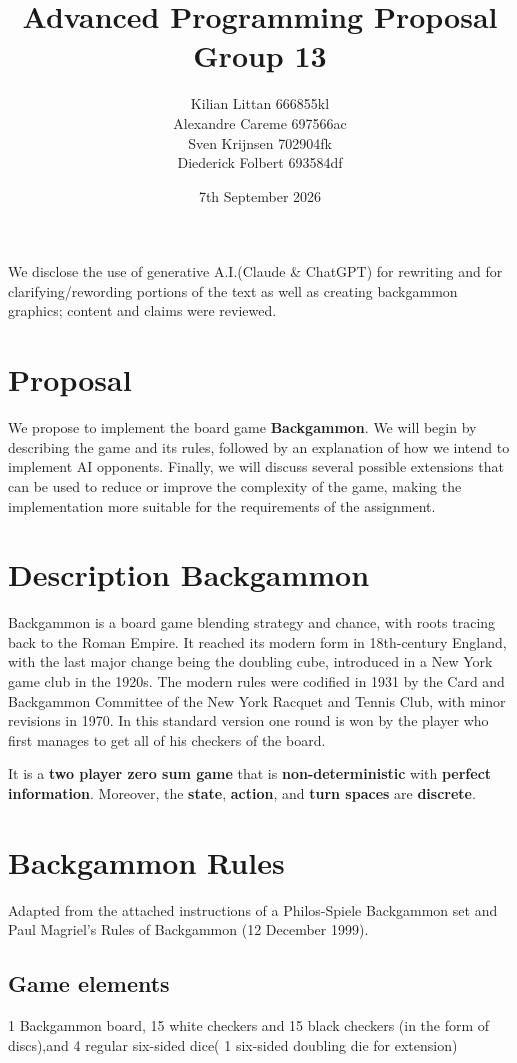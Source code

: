 \documentclass[11pt]{article}
\title{Advanced Programming Proposal Group 13}
\author{Kilian Littan 666855kl \\
Alexandre Careme 697566ac\\
Sven Krijnsen  702904fk\\
Diederick Folbert 693584df \\
}
\date{7th September 2026}
\begin{document}

\maketitle
We disclose the use of generative A.I.(Claude \& ChatGPT) for rewriting and for clarifying/rewording portions of the text as well as creating backgammon graphics; content and claims were reviewed.
\section{Proposal}
We propose to implement the board game \textbf{Backgammon}. We will begin by describing the game and its rules, followed by an explanation of how we intend to implement AI opponents. Finally, we will discuss several possible extensions that can be used to reduce or improve the complexity of the game, making the implementation more suitable for the requirements of the assignment.

\section{Description Backgammon}
Backgammon is a board game blending strategy and chance, with roots tracing back to the Roman Empire. It reached its modern form in 18th-century England, with the last major change being the doubling cube, introduced in a New York game club in the 1920s. The modern rules were codified in 1931 by the Card and Backgammon Committee of the New York Racquet and Tennis Club, with minor revisions in 1970. In this standard version one round is won by the player who first manages to get all of his checkers of the board.

It is a \textbf{two player zero sum game} that is \textbf{non-deterministic} with \textbf{perfect information}. Moreover, the \textbf{state}, \textbf{action}, and \textbf{turn spaces} are \textbf{discrete}.

\section{Backgammon Rules}
Adapted from the attached instructions of a Philos-Spiele Backgammon set and Paul Magriel's Rules of Backgammon
(12 December 1999).

\subsection*{Game elements}
1 Backgammon board, 15 white checkers and 15 black checkers (in the form of discs),and 4 regular six-sided dice( 1 six-sided doubling die for extension)
\end{document}
